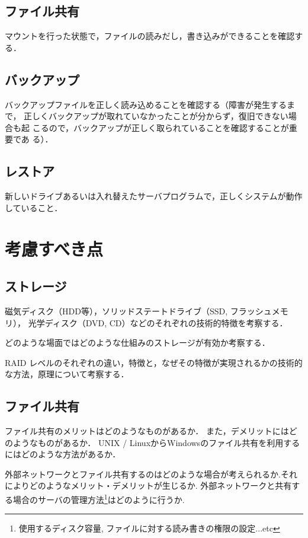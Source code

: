 \subsection*{ファイル共有}
マウントを行った状態で，ファイルの読みだし，書き込みができることを確認す
る．



\subsection*{バックアップ}

バックアップファイルを正しく読み込めることを確認する（障害が発生するまで，
正しくバックアップが取れていなかったことが分からず，復旧できない場合も起
こるので，バックアップが正しく取られていることを確認することが重要であ
る）．


\subsection*{レストア}

新しいドライブあるいは入れ替えたサーバプログラムで，正しくシステムが動作していること．


\section{考慮すべき点}

\subsection*{ストレージ}

磁気ディスク（HDD等），ソリッドステートドライブ（SSD, フラッシュメモリ），
光学ディスク（DVD, CD）などのそれぞれの技術的特徴を考察する．

どのような場面ではどのような仕組みのストレージが有効か考察する．

RAID レベルのそれぞれの違い，特徴と，なぜその特徴が実現されるかの技術的
な方法，原理について考察する．


\subsection*{ファイル共有}

ファイル共有のメリットはどのようなものがあるか．
また，デメリットにはどのようなものがあるか．
UNIX / LinuxからWindowsのファイル共有を利用するにはどのような方法があるか．

外部ネットワークとファイル共有するのはどのような場合が考えられるか.それによりどのようなメリット・デメリットが生じるか.
外部ネットワークと共有する場合のサーバの管理方法\footnote{使用するディスク容量, ファイルに対する読み書きの権限の設定...etc}はどのように行うか.

